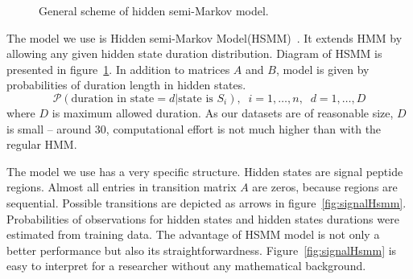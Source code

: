 \documentclass[fleqn,10pt,twoside]{gcb15submission}
\begin{document}
\begin{figure}[h]
\caption{General scheme of hidden semi-Markov model.}
\label{fig:hsmm}
\end{figure}

The model we use is Hidden semi-Markov Model(HSMM)~\citep{Yu2010215}. It extends HMM by allowing 
any given hidden state duration distribution. Diagram of HSMM is presented in figure~\ref{fig:hsmm}.
In addition to matrices $A$ and $B$, model is given by probabilities of duration length in hidden states.
$$\mathcal{P}(\text{duration in state} = d | \text{state is } S_i), \;\; i = 1, \dots, n, \;\; d = 1, \dots, D$$
where $D$ is maximum allowed duration.
As our datasets are of reasonable size, $D$ is small -- around 30, computational effort is not much 
higher than with the regular HMM. 

The model we use has a very specific structure. Hidden states are signal peptide regions.
Almost all entries in transition matrix $A$ are zeros, because regions are sequential.
Possible transitions are depicted as arrows in figure~\ref{fig:signalHsmm}.
Probabilities of observations for hidden states and hidden states durations were estimated from training data.
The advantage of HSMM model is not only a better performance but also its straightforwardness.
Figure~\ref{fig:signalHsmm} is easy to interpret for a researcher without any mathematical background.
\end{document}
